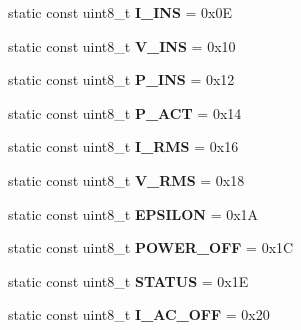 \begin{DoxyCompactItemize}
\item 
\hypertarget{structRegReadCmd_a6a60bf40d92eb138d8ad908e81eb7167}{static const uint8\-\_\-t {\bfseries I\-\_\-\-I\-N\-S} = 0x0\-E}\label{structRegReadCmd_a6a60bf40d92eb138d8ad908e81eb7167}

\item 
\hypertarget{structRegReadCmd_a6504ad862aac69a6d016388d9710cbe3}{static const uint8\-\_\-t {\bfseries V\-\_\-\-I\-N\-S} = 0x10}\label{structRegReadCmd_a6504ad862aac69a6d016388d9710cbe3}

\item 
\hypertarget{structRegReadCmd_a7b1ce74d8b44c0ca0f27e9774098d7b3}{static const uint8\-\_\-t {\bfseries P\-\_\-\-I\-N\-S} = 0x12}\label{structRegReadCmd_a7b1ce74d8b44c0ca0f27e9774098d7b3}

\item 
\hypertarget{structRegReadCmd_a34cfa9760bdfaa96c3f159b99cd1b3be}{static const uint8\-\_\-t {\bfseries P\-\_\-\-A\-C\-T} = 0x14}\label{structRegReadCmd_a34cfa9760bdfaa96c3f159b99cd1b3be}

\item 
\hypertarget{structRegReadCmd_a7fb37bc1cdbd5e6b40da2b40fde4ce69}{static const uint8\-\_\-t {\bfseries I\-\_\-\-R\-M\-S} = 0x16}\label{structRegReadCmd_a7fb37bc1cdbd5e6b40da2b40fde4ce69}

\item 
\hypertarget{structRegReadCmd_ab3b4442275fd0d55144c5ac059984aea}{static const uint8\-\_\-t {\bfseries V\-\_\-\-R\-M\-S} = 0x18}\label{structRegReadCmd_ab3b4442275fd0d55144c5ac059984aea}

\item 
\hypertarget{structRegReadCmd_a9c6c46abfeca122a51a63790de13a593}{static const uint8\-\_\-t {\bfseries E\-P\-S\-I\-L\-O\-N} = 0x1\-A}\label{structRegReadCmd_a9c6c46abfeca122a51a63790de13a593}

\item 
\hypertarget{structRegReadCmd_ad0cc53e7ec65684ef6503f30c079b4ec}{static const uint8\-\_\-t {\bfseries P\-O\-W\-E\-R\-\_\-\-O\-F\-F} = 0x1\-C}\label{structRegReadCmd_ad0cc53e7ec65684ef6503f30c079b4ec}

\item 
\hypertarget{structRegReadCmd_abff798bbea5df4cc6c1640d558071e22}{static const uint8\-\_\-t {\bfseries S\-T\-A\-T\-U\-S} = 0x1\-E}\label{structRegReadCmd_abff798bbea5df4cc6c1640d558071e22}

\item 
\hypertarget{structRegReadCmd_ab823316f3346b630168fec8a4075252d}{static const uint8\-\_\-t {\bfseries I\-\_\-\-A\-C\-\_\-\-O\-F\-F} = 0x20}\label{structRegReadCmd_ab823316f3346b630168fec8a4075252d}


\end{DoxyCompactItemize}
